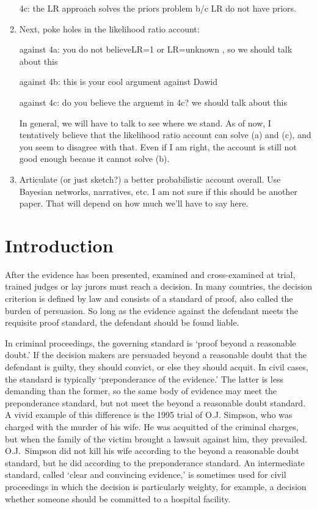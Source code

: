 \documentclass[10pt,dvipsnames,enabledeprecatedfontcommands]{scrartcl}
\begin{document}
\begin{enumerate}
4c: the LR approach solves the priors problem b/c LR do not have priors.


\item Next, poke holes in the likelihood ratio account:

against 4a: you do not believeLR=1 or LR=unknown , so we should  talk about this

against 4b: this is your cool argument against Dawid

against 4c: do you believe the arguemt in 4c? we should talk about this 

In general, we will have to talk to see where we stand. As of now, I tentatively believe that the likelihood ratio account can solve (a) and (c), and you seem to disagree with that. Even if I am right, the account is still not good enough becaue it cannot solve (b).

\item Articulate (or just sketch?) a better probabilistic account overall. 
Use Bayesian networks, narratives, etc. I am not sure if this 
should be another paper. That will depend on how much we'll 
have to say here. 


\end{enumerate}

\tableofcontents

\hypertarget{introduction}{%
\section{Introduction}\label{introduction}}

After the evidence has been presented, examined and cross-examined at
trial, trained judges or lay jurors must reach a decision. In many
countries, the decision criterion is defined by law and consists of a
standard of proof, also called the burden of persuasion. So long as the
evidence against the defendant meets the requisite proof standard, the
defendant should be found liable.

In criminal proceedings, the governing standard is `proof beyond a
reasonable doubt.' If the decision makers are persuaded beyond a
reasonable doubt that the defendant is guilty, they should convict, or
else they should acquit. In civil cases, the standard is typically
`preponderance of the evidence.' The latter is less demanding than the
former, so the same body of evidence may meet the preponderance
standard, but not meet the beyond a reasonable doubt standard. A vivid
example of this difference is the 1995 trial of O.J. Simpson, who was
charged with the murder of his wife. He was acquitted of the criminal
charges, but when the family of the victim brought a lawsuit against
him, they prevailed. O.J.~Simpson did not kill his wife according to the
beyond a reasonable doubt standard, but he did according to the
preponderance standard. An intermediate standard, called `clear and
convincing evidence,' is sometimes used for civil proceedings in which
the decision is particularly weighty, for example, a decision whether
someone should be committed to a hospital facility.
\end{document}

